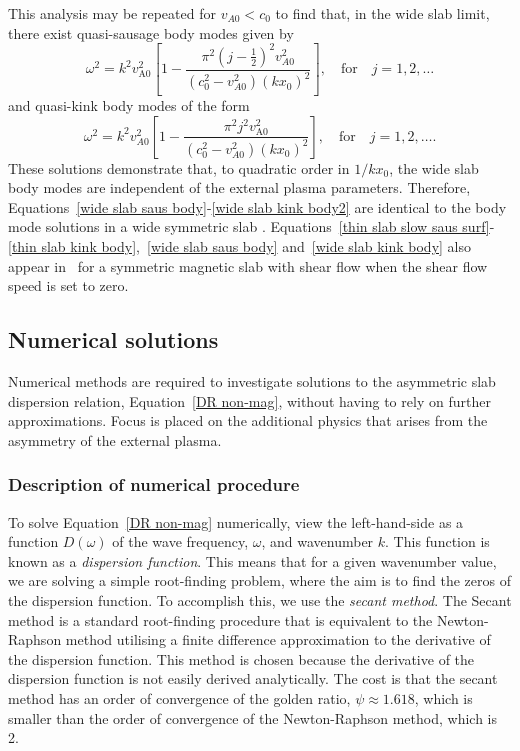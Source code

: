 This analysis may be repeated for $v_{A0} < c_0$ to find that, in the wide slab limit, there exist quasi-sausage body modes given by
\begin{equation}
\omega^2 = k^2v_\textrm{A0}^2\left[1 - \frac{\pi^2(j - \frac{1}{2})^2v_{A0}^2}{(c_0^2 - v_{A0}^2)(kx_0)^2}\right], \quad \text{for} \quad j = 1, 2, \ldots \label{wide slab saus body2}
\end{equation}
and quasi-kink body modes of the form
\begin{equation}
\omega^2 = k^2v_{A0}^2\left[1 - \frac{\pi^2j^2v_\textrm{A0}^2}{(c_0^2 - v_{A0}^2)(kx_0)^2}\right], \quad \text{for} \quad j = 1, 2, \ldots . \label{wide slab kink body2}
\end{equation}
These solutions demonstrate that, to quadratic order in $1/kx_0$, the wide slab body modes are independent of the external plasma parameters. Therefore, Equations~\eqref{wide slab saus body}-\eqref{wide slab kink body2} are identical to the body mode solutions in a wide symmetric slab \citep{rob81b}. Equations~\eqref{thin slab slow saus surf}-\eqref{thin slab kink body},~\eqref{wide slab saus body} and~\eqref{wide slab kink body} also appear in~\cite{li_etal13} for a symmetric magnetic slab with shear flow when the shear flow speed is set to zero.


\subsection{Numerical solutions} \label{sec: numerical solutions}

Numerical methods are required to investigate solutions to the asymmetric slab dispersion relation, Equation~\eqref{DR non-mag}, without having to rely on further approximations. Focus is placed on the additional physics that arises from the asymmetry of the external plasma.


\subsubsection{Description of numerical procedure}

To solve Equation~\eqref{DR non-mag} numerically, view the left-hand-side as a function $D(\omega)$ of the wave frequency, $\omega$, and wavenumber $k$. This function is known as a \textit{dispersion function}. This means that for a given wavenumber value, we are solving a simple root-finding problem, where the aim is to find the zeros of the dispersion function. To accomplish this, we use the \textit{secant method}. The Secant method is a standard root-finding procedure that is equivalent to the Newton-Raphson method utilising a finite difference approximation to the derivative of the dispersion function. This method is chosen because the derivative of the dispersion function is not easily derived analytically. The cost is that the secant method has an order of convergence of the golden ratio, $\psi \approx 1.618$, which is smaller than the order of convergence of the Newton-Raphson method, which is 2.

